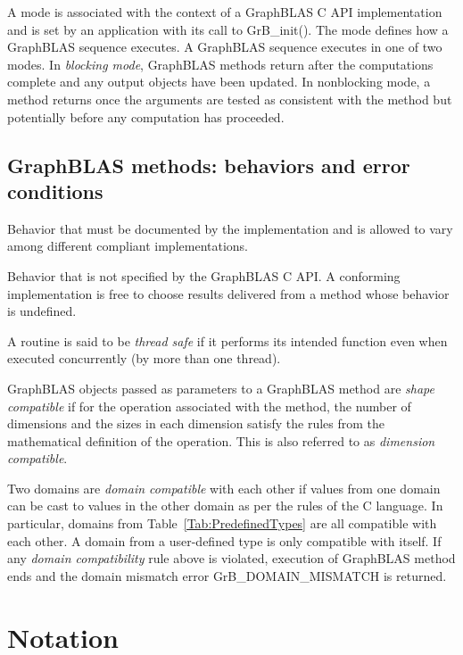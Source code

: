  A mode is associated with the context of a GraphBLAS C API
implementation and is set by an application with its call to {\sf GrB\_init()}.
The mode defines how a GraphBLAS sequence executes.  A
GraphBLAS sequence executes in one of two modes.  
In \emph{blocking mode}, GraphBLAS methods return after the computations 
complete and any output objects have been updated.  In nonblocking mode, a 
method returns once the arguments are tested as consistent with 
the method but potentially before any computation has proceeded.
\glossEnd

\subsection{GraphBLAS methods: behaviors and error conditions}
\glossBegin
{} Behavior that must be documented
by the implementation and is allowed to vary among different
compliant implementations. 

 Behavior that is not specified by the GraphBLAS C API.
A conforming implementation is free to choose results delivered from a method
whose behavior is undefined. 

 A routine is said to be \emph{thread safe} if it performs its intended 
function even when executed concurrently (by more than one thread).

 GraphBLAS objects passed as parameters to a GraphBLAS method 
are \emph{shape compatible} if for the operation associated with the method, the number of dimensions
and the sizes in each dimension satisfy the rules from the mathematical definition of the operation.  This
is also referred to as \emph{dimension compatible}.

 Two domains are \emph{domain compatible} with 
each other if values from one domain can be cast to values in the other domain 
as per the rules of the C language. In particular, domains from Table~\ref{Tab:PredefinedTypes} 
are all compatible with each other. A domain from a user-defined type is only 
compatible with itself. If any \emph{domain compatibility} rule above is 
violated, execution of GraphBLAS method ends and the domain 
mismatch error {\sf GrB\_DOMAIN\_MISMATCH} is returned.
\glossEnd

\vfill


\section{Notation}


